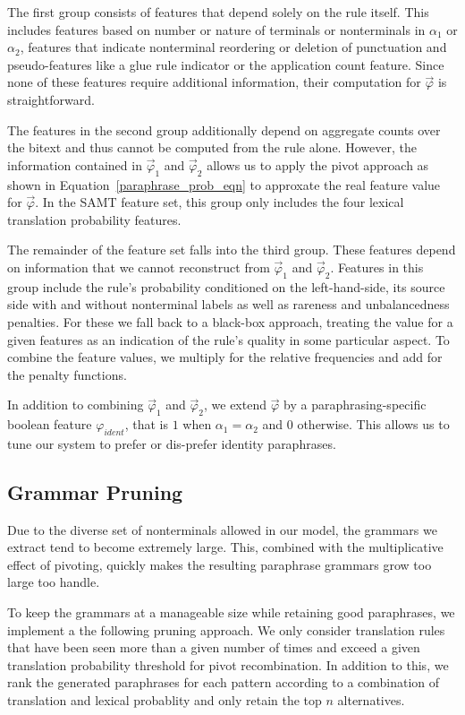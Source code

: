 \documentclass[11pt]{article}
\newcommand{\mnote}[1]{\marginpar{%
  \vskip-\baselineskip
  \raggedright\footnotesize
  \itshape\hrule\smallskip\footnotesize{#1}\par\smallskip\hrule}}
\begin{document}
The first group consists of features that depend solely on the rule
itself. This includes features based on number or nature of terminals
or nonterminals in $\alpha_1$ or $\alpha_2$, features that indicate
nonterminal reordering or deletion of punctuation and pseudo-features
like a glue rule indicator or the application count feature. Since
none of these features require additional information, their
computation for $\vec{\varphi}$ is straightforward.

The features in the second group additionally depend on aggregate
counts over the bitext and thus cannot be computed from the rule
alone. However, the information contained in $\vec{\varphi}_1$ and
$\vec{\varphi}_2$ allows us to apply the pivot approach as shown in
Equation~\ref{paraphrase_prob_eqn} to approxate the real feature value
for $\vec{\varphi}$. In the SAMT feature set, this group only includes
the four lexical translation probability features.

The remainder of the feature set falls into the third group. These
features depend on information that we cannot reconstruct from
$\vec{\varphi}_1$ and $\vec{\varphi}_2$. Features in this group
include the rule's probability conditioned on the left-hand-side, its
source side with and without nonterminal labels as well as rareness
and unbalancedness penalties. For these we fall back to a black-box
approach, treating the value for a given features as an indication of
the rule's quality in some particular aspect. To combine the feature
values, we multiply for the relative frequencies and add for the
penalty functions.

In addition to combining $\vec{\varphi}_1$ and $\vec{\varphi}_2$, we
extend $\vec{\varphi}$ by a paraphrasing-specific boolean feature
$\varphi_{\mathit{ident}}$, that is $1$ when $\alpha_1 = \alpha_2$ and
$0$ otherwise. This allows us to tune our system to prefer or
dis-prefer identity paraphrases.


\subsection{Grammar Pruning}
\label{pruning}

Due to the diverse set of nonterminals allowed in our model, the
grammars we extract tend to become extremely large. This, combined
with the multiplicative effect of pivoting, quickly makes the
resulting paraphrase grammars grow too large too handle.

To keep the grammars at a manageable size while retaining good
paraphrases, we implement a the following pruning approach. We only
consider translation rules that have been seen more than a given
number of times and exceed a given translation probability threshold
for pivot recombination. In addition to this, we rank the generated
paraphrases for each pattern according to a combination of translation
and lexical probablity and only retain the top $n$
alternatives. \mnote{This is a little wonky, maybe drop the top-$n$
  pruning?}
\end{document}
